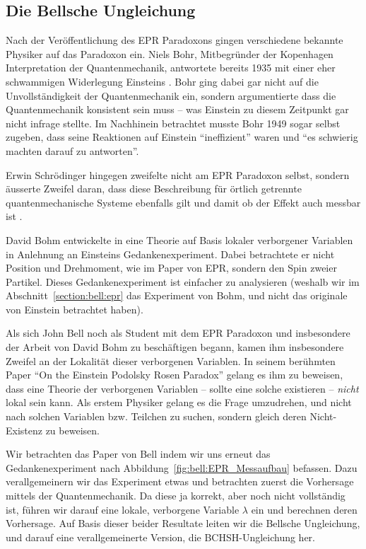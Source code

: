 \begin{refsection}
\section{Die Bellsche Ungleichung\label{section:bell:bell}}
Nach der Ver\"offentlichung des EPR Paradoxons gingen verschiedene bekannte
Physiker auf das Paradoxon ein.
Niels Bohr, Mitbegr\"under der Kopenhagen Interpretation der Quantenmechanik,
antwortete bereits 1935 mit einer eher schwammigen Widerlegung Einsteins
\cite{Bell:Bohr1935}.
Bohr ging dabei gar nicht auf die Unvollst\"andigkeit der Quantenmechanik ein,
sondern argumentierte dass die Quantenmechanik konsistent sein muss -- was
Einstein zu diesem Zeitpunkt gar nicht infrage stellte.
Im Nachhinein betrachtet musste Bohr 1949 sogar selbst zugeben, dass seine
Reaktionen auf Einstein \enquote{ineffizient} waren und 
\enquote{es schwierig machten darauf zu antworten}. 

Erwin Schr\"odinger hingegen zweifelte nicht am EPR Paradoxon selbst, sondern
\"ausserte Zweifel daran, dass diese Beschreibung f\"ur \"ortlich getrennte
quantenmechanische Systeme ebenfalls gilt und damit ob der Effekt auch
messbar ist \cite{Bell:Schroedinger1936}.

David Bohm entwickelte in \cite{Bell:Bohm1952} eine Theorie auf Basis
lokaler verborgener Variablen in Anlehnung an Einsteins Gedankenexperiment.
Dabei betrachtete er nicht  Position und Drehmoment, wie im Paper von EPR,
sondern den Spin zweier Partikel.
Dieses Gedankenexperiment ist einfacher zu analysieren (weshalb wir im
Abschnitt~\ref{section:bell:epr} das Experiment von Bohm, und nicht das
originale von Einstein betrachtet haben).

Als sich John Bell noch als Student mit dem EPR Paradoxon und insbesondere
der Arbeit von David Bohm zu besch\"aftigen begann, kamen ihm insbesondere
Zweifel an der Lokalit\"at dieser verborgenen Variablen.
In seinem ber\"uhmten Paper
\enquote{On the Einstein Podolsky Rosen Paradox} \cite{Bell:Bell1964}
gelang es ihm zu beweisen, dass eine Theorie der verborgenen Variablen -- sollte
eine solche existieren -- \emph{nicht} lokal sein kann.
Als erstem Physiker gelang es die Frage umzudrehen, und nicht nach solchen
Variablen bzw. Teilchen zu suchen, sondern gleich deren Nicht-Existenz
zu beweisen.

Wir betrachten das Paper von Bell indem wir uns erneut das Gedankenexperiment 
nach Abbildung~\ref{fig:bell:EPR_Messaufbau} befassen.
Dazu verallgemeinern wir das Experiment etwas und betrachten zuerst die
Vorhersage mittels der Quantenmechanik.
Da diese ja korrekt, aber noch nicht vollst\"andig ist, f\"uhren wir darauf
eine lokale, verborgene Variable $\lambda$ ein und berechnen deren Vorhersage.
Auf Basis dieser beider Resultate leiten wir die Bellsche Ungleichung, und
darauf eine verallgemeinerte Version, die BCHSH-Ungleichung her.


\end{refsection}

